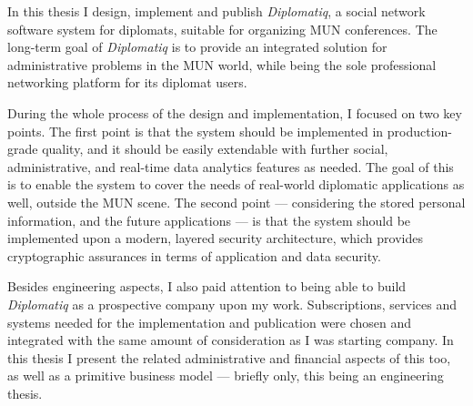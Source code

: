In this thesis I design, implement and publish \emph{Diplomatiq}, a social network software system for diplomats, suitable for organizing MUN conferences. The long-term goal of \emph{Diplomatiq} is to provide an integrated solution for administrative problems in the MUN world, while being the sole professional networking platform for its diplomat users.

During the whole process of the design and implementation, I focused on two key points. The first point is that the system should be implemented in production-grade quality, and it should be easily extendable with further social, administrative, and real-time data analytics features as needed. The goal of this is to enable the system to cover the needs of real-world diplomatic applications as well, outside the MUN scene. The second point — considering the stored personal information, and the future applications — is that the system should be implemented upon a modern, layered security architecture, which provides cryptographic assurances in terms of application and data security.

Besides engineering aspects, I also paid attention to being able to build \emph{Diplomatiq} as a prospective company upon my work. Subscriptions, services and systems needed for the implementation and publication were chosen and integrated with the same amount of consideration as I was starting company. In this thesis I present the related administrative and financial aspects of this too, as well as a primitive business model — briefly only, this being an engineering thesis.

